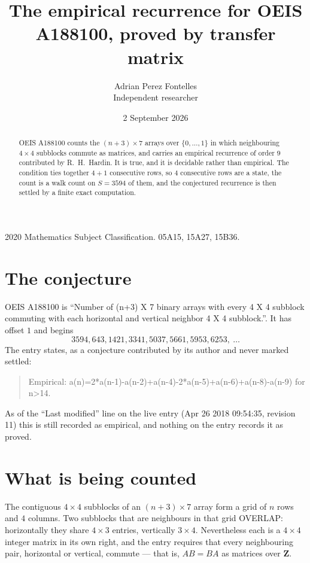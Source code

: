 \documentclass[11pt,a4paper]{article}
\title{The empirical recurrence for OEIS A188100, proved by transfer matrix}
\author{Adrian Perez Fontelles\\ \small Independent researcher}
\date{2 September 2026}
\theoremstyle{plain}
\theoremstyle{definition}
\begin{document}
\maketitle

\begin{abstract}
OEIS A188100 counts the $(n+3)\times7$ arrays over $\{0,\dots,1\}$ in which
neighbouring $4\times4$ subblocks commute as matrices, and carries an empirical
recurrence
of order $9$ contributed by R.~H.~Hardin. It is true, and it is decidable rather than
empirical. The condition ties together $4+1$ consecutive rows, so $4$ consecutive rows are
a state, the count is a walk count on $S=3594$ of them, and the conjectured recurrence is then
settled by a finite exact computation.
\end{abstract}

\noindent\small 2020 Mathematics Subject Classification. 05A15, 15A27, 15B36.\normalsize

\section{The conjecture}

OEIS A188100 is ``Number of (n+3) X 7 binary arrays with every 4 X 4 subblock commuting with each horizontal and vertical neighbor 4 X 4 subblock.''. It has offset $1$ and begins
\[
3594, 643, 1421, 3341, 5037, 5661, 5953, 6253,\ \dots
\]
The entry states, as a conjecture contributed by its author and never marked settled:
\begin{quote}
Empirical: a(n)=2*a(n-1)-a(n-2)+a(n-4)-2*a(n-5)+a(n-6)+a(n-8)-a(n-9) for n>14.
\end{quote}
As of the ``Last modified'' line on the live entry (Apr 26 2018 09:54:35, revision 11) this is still
recorded as empirical, and nothing on the entry records it as proved.

\section{What is being counted}

The contiguous $4\times4$ subblocks of an $(n+3)\times7$ array form a grid of $n$
rows and $4$ columns. Two subblocks that are neighbours in that
grid OVERLAP: horizontally they share $4\times3$ entries, vertically
$3\times4$. Nevertheless each is a $4\times4$ integer matrix in its own right, and
the entry requires that every neighbouring pair, horizontal or vertical, commute --- that is,
$AB=BA$ as matrices over $\mathbf{Z}$.
\end{document}
